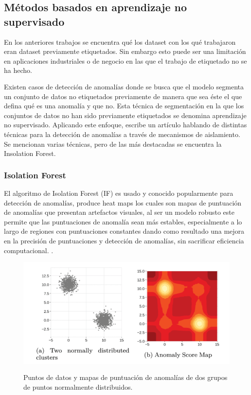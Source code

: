 \documentclass[11pt,a4paper,spanish]{book}
\numberwithin{equation}{chapter}
\numberwithin{figure}{chapter}
\begin{document}
\subsection{Métodos basados en aprendizaje no supervisado}


En los anteriores trabajos se encuentra qué los dataset con los qué trabajaron eran 
dataset previamente etiquetados. Sin embargo esto puede ser una limitación en 
aplicaciones industriales o de negocio en las que el trabajo de etiquetado no se ha 
hecho.


Existen casos de detección de anomalías donde se busca que el modelo segmenta un 
conjunto de datos no etiquetados previamente de manera que sea éste el que defina qué 
es una anomalía y que no. Esta técnica de segmentación en la que los conjuntos de datos 
no han sido previamente etiquetados se denomina aprendizaje no supervisado. Aplicando 
este enfoque,  \cite{Cao_2025} escribe un artículo hablando de distintas técnicas para 
la detección de anomalías a través de mecanismos de aislamiento. Se mencionan varias 
técnicas, pero de las más destacadas se encuentra la Insolation Forest.


\subsubsection{Isolation Forest}

El algoritmo de Isolation Forest (IF) es usado y conocido popularmente para detección de 
anomalías, produce heat maps los cuales son mapas de puntuación de anomalías que 
presentan artefactos visuales, al ser un modelo robusto este permite que las 
puntuaciones de anomalía sean más estables, especialmente a lo largo de regiones con 
puntuaciones constantes dando como resultado una mejora en la precisión de puntuaciones 
y detección de anomalías, sin sacrificar eficiencia computacional. 
\cite{liu2021isoletionforest}.

\begin{figure}[h]
	\caption{Puntos de datos y mapas de puntuación de anomalías de dos grupos de puntos 
    normalmente distribuidos.  \protect\cite{liu2021isoletionforest} }
    \centering
    \includegraphics[width=1.0\textwidth]{media/liu-isolation-forest.png}
    \label{fig:figIsolationForest}
\end{figure}
\end{document}
